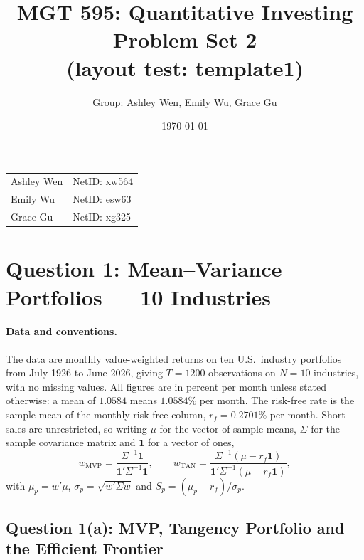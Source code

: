 \documentclass[11pt]{article}
\title{MGT 595: Quantitative Investing \\ Problem Set 2 \\ \large (layout test: template1)}
\author{Group: Ashley Wen, Emily Wu, Grace Gu}
\date{\today}
\begin{document}
\maketitle

\begin{center}
\small
\begin{tabular}{ll}
Ashley Wen & NetID: xw564 \\
Emily Wu   & NetID: esw63 \\
Grace Gu   & NetID: xg325 \\
\end{tabular}
\end{center}

\vspace{1em}

\section{Question 1: Mean--Variance Portfolios --- 10 Industries}

\paragraph{Data and conventions.} The data are monthly value-weighted returns
on ten U.S.\ industry portfolios from July 1926 to June 2026, giving
$T = 1200$ observations on $N = 10$ industries, with no missing values. All
figures are in percent per month unless stated otherwise: a mean of $1.0584$
means $1.0584\%$ per month. The risk-free rate is the sample mean of the
monthly risk-free column, $r_f = 0.2701\%$ per month. Short sales are
unrestricted, so writing $\mu$ for the vector of sample means, $\Sigma$ for
the sample covariance matrix and $\mathbf{1}$ for a vector of ones,
\begin{equation}
w_{\text{MVP}} = \frac{\Sigma^{-1}\mathbf{1}}{\mathbf{1}'\Sigma^{-1}\mathbf{1}},
\qquad
w_{\text{TAN}} = \frac{\Sigma^{-1}(\mu - r_f\mathbf{1})}
                       {\mathbf{1}'\Sigma^{-1}(\mu - r_f\mathbf{1})},
\label{eq:weights}
\end{equation}
with $\mu_p = w'\mu$, $\sigma_p = \sqrt{w'\Sigma w}$ and
$S_p = (\mu_p - r_f)/\sigma_p$.

\subsection{Question 1(a): MVP, Tangency Portfolio and the Efficient Frontier}
\end{document}
